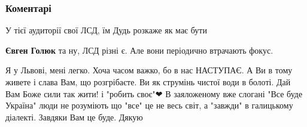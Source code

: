  
 
 
 
 
\subsubsection{Коментарі}

\begin{itemize}
 
У тієї аудиторії свої ЛСД, їм Дудь розкаже як має бути

\begin{itemize}
 
\textbf{Євген Голюк} та ну, ЛСД різні є. Але вони періодично втрачають фокус.
\end{itemize}

 

Я у Львові, мені легко. Хоча часом важко, бо в нас НАСТУПАЄ. А Ви в тому живете
і слава Вам, що розгрібаєте. Ви як струмінь чистої води в болоті. Дай Вам Боже
сили так жити! і "робить своє"❤ В заяложеному вже слогані "Все буде Україна"
люди не розуміють що "все" це не весь світ, а "завжди" в галицькому діалекті.
Завдяки Вам це буде. Дякую

\begin{itemize}
 


\end{itemize}
\end{itemize}
